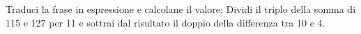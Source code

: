 \item Traduci la frase in espressione e calcolane il valore: Dividi il triplo della somma di 115 e 127 per 11 e sottrai dal risultato il doppio della differenza tra 10 e 4.
